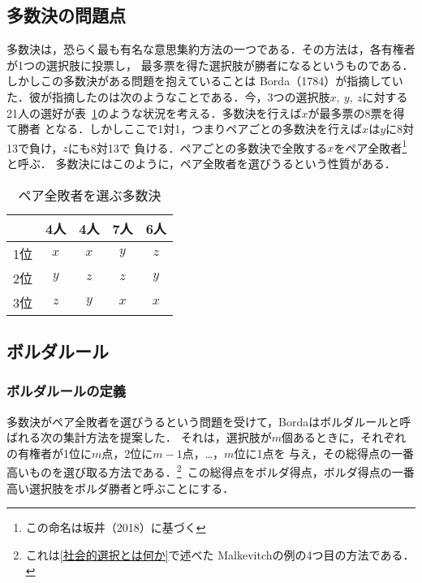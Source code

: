 \documentclass[dvipdfmx]{jsarticle}
\begin{document}
\subsection{多数決の問題点}\label{subsec:多数決の問題点}
多数決は，恐らく最も有名な意思集約方法の一つである．その方法は，各有権者が1つの選択肢に投票し，
最多票を得た選択肢が勝者になるというものである．しかしこの多数決がある問題を抱えていることは
Borda（1784）が指摘していた．彼が指摘したのは次のようなことである．今，3つの選択肢$x,\ y,\ z$に対する
21人の選好が表~\ref{ペア全敗者}のような状況を考える．多数決を行えば$x$が最多票の8票を得て勝者
となる．しかしここで1対1，つまりペアごとの多数決を行えば$x$は$y$に8対13で負け，$z$にも8対13で
負ける．ペアごとの多数決で全敗する$x$をペア全敗者\footnote{この命名は坂井（2018）に基づく}と呼ぶ．
多数決にはこのように，ペア全敗者を選びうるという性質がある．

\begin{table}[h]
  \caption{ペア全敗者を選ぶ多数決}\label{ペア全敗者}
  \begin{center}
    \begin{tabular}{c|c|c|c|c} \hline
      & 4人 & 4人 & 7人 & 6人 \\ \hline
      1位 & $x$ & $x$ & $y$ & $z$ \\
      2位 & $y$ & $z$ & $z$ & $y$ \\
      3位 & $z$ & $y$ & $x$ & $x$ \\ \hline 
    \end{tabular}
  \end{center}
\end{table}



\subsection{ボルダルール}\label{subsec:ボルダルール}
\subsubsection{ボルダルールの定義}\label{subsubsec:ボルダルールの定義}
多数決がペア全敗者を選びうるという問題を受けて，Bordaはボルダルールと呼ばれる次の集計方法を提案した．
それは，選択肢が$m$個あるときに，それぞれの有権者が1位に$m$点，2位に$m-1$点，\ldots，$m$位に1点を
与え，その総得点の一番高いものを選び取る方法である．\<\footnote{これは\ref{社会的選択とは何か}で述べた
Malkevitchの例の4つ目の方法である．}\ 
この総得点をボルダ得点，ボルダ得点の一番高い選択肢をボルダ勝者と呼ぶことにする．
\end{document}
